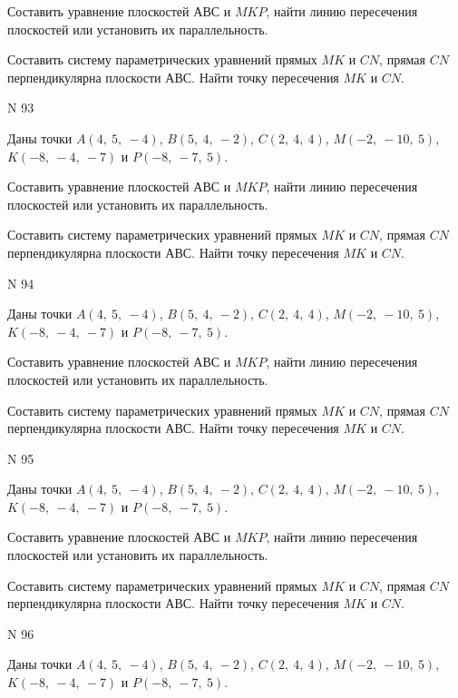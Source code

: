 \documentclass[11pt]{report}
\begin{document}
Составить уравнение плоскостей $АВС$ и $MKP$,
найти линию пересечения плоскостей или установить их параллельность.

Составить систему параметрических уравнений прямых $MK$ и $CN$,
прямая $CN$ перпендикулярна плоскости $АВС$. 
Найти точку пересечения $MK$ и $CN$.



 N 93

Даны точки $A\left( 4, \  5, \  -4\right)$, $B\left( 5, \  4, \  -2\right)$, $C\left( 2, \  4, \  4\right)$, $M\left( -2, \  -10, \  5\right)$, $K\left( -8, \  -4, \  -7\right)$ и $P\left( -8, \  -7, \  5\right)$.


Составить уравнение плоскостей $АВС$ и $MKP$,
найти линию пересечения плоскостей или установить их параллельность.

Составить систему параметрических уравнений прямых $MK$ и $CN$,
прямая $CN$ перпендикулярна плоскости $АВС$. 
Найти точку пересечения $MK$ и $CN$.



 N 94

Даны точки $A\left( 4, \  5, \  -4\right)$, $B\left( 5, \  4, \  -2\right)$, $C\left( 2, \  4, \  4\right)$, $M\left( -2, \  -10, \  5\right)$, $K\left( -8, \  -4, \  -7\right)$ и $P\left( -8, \  -7, \  5\right)$.


Составить уравнение плоскостей $АВС$ и $MKP$,
найти линию пересечения плоскостей или установить их параллельность.

Составить систему параметрических уравнений прямых $MK$ и $CN$,
прямая $CN$ перпендикулярна плоскости $АВС$. 
Найти точку пересечения $MK$ и $CN$.



 N 95

Даны точки $A\left( 4, \  5, \  -4\right)$, $B\left( 5, \  4, \  -2\right)$, $C\left( 2, \  4, \  4\right)$, $M\left( -2, \  -10, \  5\right)$, $K\left( -8, \  -4, \  -7\right)$ и $P\left( -8, \  -7, \  5\right)$.


Составить уравнение плоскостей $АВС$ и $MKP$,
найти линию пересечения плоскостей или установить их параллельность.

Составить систему параметрических уравнений прямых $MK$ и $CN$,
прямая $CN$ перпендикулярна плоскости $АВС$. 
Найти точку пересечения $MK$ и $CN$.



 N 96

Даны точки $A\left( 4, \  5, \  -4\right)$, $B\left( 5, \  4, \  -2\right)$, $C\left( 2, \  4, \  4\right)$, $M\left( -2, \  -10, \  5\right)$, $K\left( -8, \  -4, \  -7\right)$ и $P\left( -8, \  -7, \  5\right)$.
\end{document}
